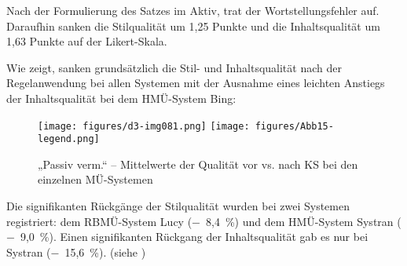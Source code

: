 Nach der Formulierung des Satzes im Aktiv, trat der Wortstellungsfehler auf. Daraufhin sanken die Stilqualität um 1,25 Punkte und die Inhaltsqualität um 1,63 Punkte auf der Likert-Skala.


Wie  zeigt, sanken grundsätzlich die Stil- und Inhaltsqualität nach der Regelanwendung bei allen Systemen mit der Ausnahme eines leichten Anstiegs der Inhaltsqualität bei dem HMÜ-System Bing:


\begin{figure}
\texttt{[image: figures/d3-img081.png]}
\texttt{[image: figures/Abb15-legend.png]}
\caption{\label{fig:05:95}„Passiv verm.“ -- Mittelwerte der Qualität vor vs. nach KS bei den einzelnen MÜ-Systemen   }
\end{figure}

Die signifikanten Rückgänge der Stilqualität wurden bei zwei Systemen registriert: dem RBMÜ-System Lucy ($-$~8,4~\%) und dem HMÜ-System Systran ($-$~9,0~\%). Einen signifikanten Rückgang der Inhaltsqualität gab es nur bei Systran ($-$~15,6~\%). (siehe )


